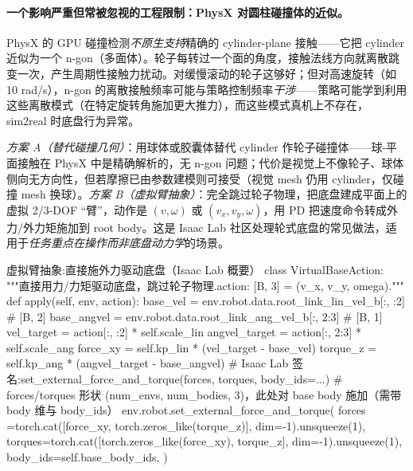 \paragraph{一个影响严重但常被忽视的工程限制：PhysX 对圆柱碰撞体的近似。}PhysX 的 GPU 碰撞检测\emph{不原生支持}精确的 cylinder-plane 接触——它把 cylinder 近似为一个 n-gon（多面体）。轮子每转过一个面的角度，接触法线方向就离散跳变一次，产生周期性接触力扰动。对缓慢滚动的轮子这够好；但对高速旋转（如 10 rad/s），n-gon 的离散接触频率可能与策略控制频率\emph{干涉}——策略可能学到利用这些离散模式（在特定旋转角施加更大推力），而这些模式真机上不存在，sim2real 时底盘行为异常。

\begin{insight}\label{ins:rlmc-wh-ngon}
\emph{方案 A（替代碰撞几何）}：用球体或胶囊体替代 cylinder 作轮子碰撞体——球-平面接触在 PhysX 中是精确解析的，无 n-gon 问题；代价是视觉上不像轮子、球体侧向无方向性，但若摩擦已由参数建模则可接受（视觉 mesh 仍用 cylinder，仅碰撞 mesh 换球）。\emph{方案 B（虚拟臂抽象）}：完全跳过轮子物理，把底盘建成平面上的虚拟 2/3-DOF “臂”，动作是 $(v,\omega)$ 或 $(v_x,v_y,\omega)$，用 PD 把速度命令转成外力/外力矩施加到 root body。这是 Isaac Lab 社区处理轮式底盘的常见做法，适用于\emph{任务重点在操作而非底盘动力学}的场景。
\end{insight}

\begin{codebox}[Python]{虚拟臂抽象:直接施外力驱动底盘（Isaac Lab 概要）}
class VirtualBaseAction:
    """直接用力/力矩驱动底盘，跳过轮子物理.action: [B, 3] = (v_x, v_y, omega)."""
    def apply(self, env, action):
        base_vel    = env.robot.data.root_link_lin_vel_b[:, :2]   # [B, 2]
        base_angvel = env.robot.data.root_link_ang_vel_b[:, 2:3]  # [B, 1]
        vel_target    = action[:, :2]  * self.scale_lin
        angvel_target = action[:, 2:3] * self.scale_ang
        force_xy = self.kp_lin * (vel_target    - base_vel)
        torque_z = self.kp_ang * (angvel_target - base_angvel)
        # Isaac Lab 签名:set_external_force_and_torque(forces, torques, body_ids=...)
        # forces/torques 形状 (num_envs, num_bodies, 3)，此处对 base body 施加（需带 body 维与 body_ids）
        env.robot.set_external_force_and_torque(
            forces =torch.cat([force_xy, torch.zeros_like(torque_z)], dim=-1).unsqueeze(1),
            torques=torch.cat([torch.zeros_like(force_xy), torque_z], dim=-1).unsqueeze(1),
            body_ids=self.base_body_ids,
        )
\end{codebox}

